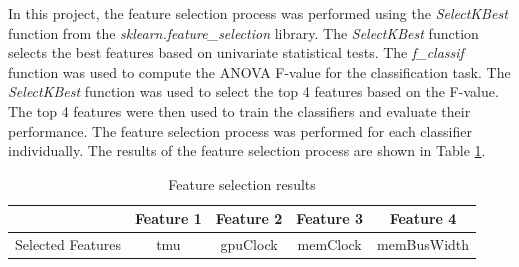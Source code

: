 \documentclass[conference,onecolumn]{IEEEtran}
\begin{document}
            In this project, the feature selection process was performed using the \emph{SelectKBest} function from the \emph{sklearn.feature\_selection} library. The \emph{SelectKBest} function selects the best features based on univariate statistical tests. The \emph{f\_classif} function was used to compute the ANOVA F-value for the classification task. The \emph{SelectKBest} function was used to select the top 4 features based on the F-value. The top 4 features were then used to train the classifiers and evaluate their performance. The feature selection process was performed for each classifier individually. The results of the feature selection process are shown in Table \ref{table:featureSelectionResults}. 
            
            \begin{table}[H]
                \centering
                \begin{tabular}{c|c|c|c|c}
                    \hline
                    &   Feature 1 &   Feature 2 &   Feature 3 &   Feature 4 \\  \hline
                    \hline
                    Selected Features 	&tmu	& gpuClock	& memClock	& memBusWidth   \\
                    \hline
                \end{tabular}
                \caption{Feature selection results}
                \label{table:featureSelectionResults}
            \end{table}
\end{document}
